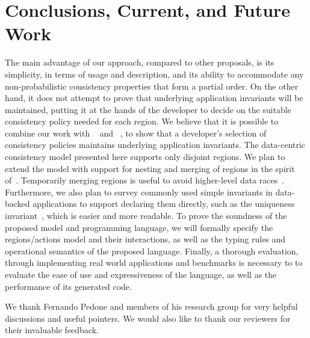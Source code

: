 \documentclass[numbers]{sigplanconf}
\begin{document}
\section{Conclusions, Current, and Future Work}
\label{sec:conclusion}
The main advantage of our approach, compared to other proposals, is its simplicity,
in terms of usage and description, and its ability to accommodate any
non-probabilistic consistency properties that form a partial order. On the
other hand, it 
does not attempt to prove that underlying 
application invariants will be maintained,
putting it at the hands of the developer to decide 
on the suitable consistency policy needed for each region. We believe that it is 
possible to combine our work with ~\cite{gotsman2016cause}
and ~\cite{balegas2015putting}, to show that a developer's selection of consistency
policies maintains underlying application invariants.
The data-centric consistency model presented here supports only 
disjoint regions. We plan to extend the model with support for nesting and merging 
of regions in the spirit of~\cite{dolby2012data}.
Temporarily merging regions is useful to avoid higher-level data races~\cite{artho2003high}.
Furthermore, we also plan to survey commonly used simple invariants in data-backed applications to support
declaring them directly, such as the uniqueness invariant~\cite{bailis2015feral},
which is easier  and more readable. To prove the soundness of the proposed model and 
programming language, we will formally specify the regions/actions model and their
interactions, as well as the typing rules and operational semantics of the
proposed language. Finally, a thorough evaluation, through implementing
real world applications and benchmarks is necessary to to evaluate the ease of use
and expressiveness of the language, as well as the performance of its generated
code.


\acks We thank Fernando Pedone and members of his research group
for very helpful discussions and useful pointers. We would also like to
thank our reviewers for their invaluable feedback.







\end{document}
